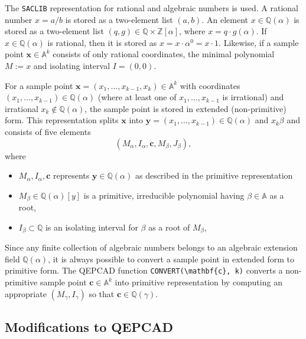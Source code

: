 \documentclass[
]{book}
\providecommand{\tightlist}{%
  \setlength{\itemsep}{0pt}\setlength{\parskip}{0pt}}
\theoremstyle{definition}
\theoremstyle{definition}
\theoremstyle{definition}
\theoremstyle{definition}
\theoremstyle{remark}
\begin{document}
The \texttt{SACLIB} representation for rational and algebraic numbers is used. A rational number \(x = a/b\) is stored as a two-element list \((a,b)\). An element \(x \in \mathbb{Q}(\alpha)\) is stored as a two-element list \((q, g) \in \mathbb{Q}\times \mathbb{Z}[\alpha]\), where \(x = q \cdot g(\alpha)\). If \(x \in \mathbb{Q}(\alpha)\) is rational, then it is stored as \(x = x \cdot \alpha^0 = x \cdot 1\). Likewise, if a sample point \(\mathbf{x} \in \mathbb{A}^k\) consists of only rational coordinates, the minimal polynomial \(M := x\) and isolating interval \(I = (0,0)\).

For a sample point \(\mathbf{x} = (x_1,\ldots,x_{k-1},x_k) \in \mathbb{A}^k\) with coordinates \((x_1,\ldots,x_{k-1}) \in \mathbb{Q}(\alpha)\) (where at least one of \(x_1,\ldots,x_{k-1}\) is irrational) and irrational \(x_k \not \in \mathbb{Q}(\alpha)\), the sample point is stored in extended (non-primitive) form.
This representation splits \(\mathbf{x}\) into \(\mathbf{y} = (x_1,\ldots,x_{k-1}) \in \mathbb{Q}(\alpha)\) and \(x_k \beta\) and consists of five elements
\[
(M_\alpha, I_\alpha, \mathbf{c}, M_\beta, J_\beta),
\]
where

\begin{itemize}
\tightlist
\item
  \(M_\alpha, I_\alpha, \mathbf{c}\) represents \(\mathbf{y} \in \mathbb{Q}(\alpha)\) as described in the primitive representation
\item
  \(M_\beta \in \mathbb{Q}(\alpha)[y]\) is a primitive, irreducible polynomial having \(\beta \in \mathbb{A}\) as a root,
\item
  \(I_\beta \subset \mathbb{Q}\) is an isolating interval for \(\beta\) as a root of \(M_\beta\),
\end{itemize}

Since any finite collection of algebraic numbers belongs to an algebraic extension field \(\mathbb{Q}(\alpha)\), it is always possible to convert a sample point in extended form to primitive form. The QEPCAD function \texttt{CONVERT(\textbackslash{}mathbf\{c\},\ k)} converts a non-primitive sample point \(\mathbf{c} \in \mathbb{A}^k\) into primitive representation by computing an appropriate \((M_\gamma, I_\gamma)\) so that \(\mathbf{c} \in \mathbb{Q}(\gamma)\).

\hypertarget{modifications-to-qepcad}{%
\subsection{Modifications to QEPCAD}\label{modifications-to-qepcad}}
\end{document}
